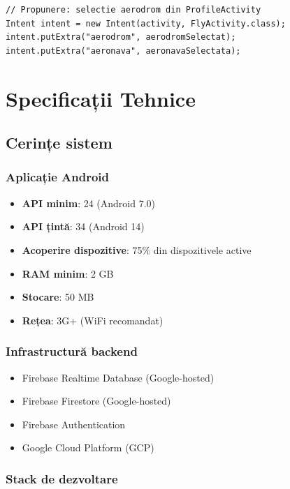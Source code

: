 \documentclass[11pt,a4paper]{report}
\begin{document}
\begin{lstlisting}
// Propunere: selectie aerodrom din ProfileActivity
Intent intent = new Intent(activity, FlyActivity.class);
intent.putExtra("aerodrom", aerodromSelectat);
intent.putExtra("aeronava", aeronavaSelectata);
\end{lstlisting}

\chapter{Specificații Tehnice}

\section{Cerințe sistem}

\subsection{Aplicație Android}

\begin{itemize}
    \item \textbf{API minim}: 24 (Android 7.0)
    \item \textbf{API țintă}: 34 (Android 14)
    \item \textbf{Acoperire dispozitive}: 75\% din dispozitivele active
    \item \textbf{RAM minim}: 2 GB
    \item \textbf{Stocare}: 50 MB
    \item \textbf{Rețea}: 3G+ (WiFi recomandat)
\end{itemize}

\subsection{Infrastructură backend}

\begin{itemize}
    \item Firebase Realtime Database (Google-hosted)
    \item Firebase Firestore (Google-hosted)
    \item Firebase Authentication
    \item Google Cloud Platform (GCP)
\end{itemize}

\subsection{Stack de dezvoltare}
\end{document}
